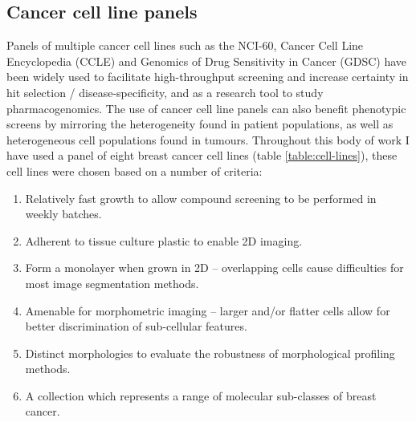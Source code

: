 \documentclass[a4paper,11pt,twoside,openright]{scrbook}
\begin{document}
\subsection{Cancer cell line panels}
Panels of multiple cancer cell lines such as the NCI-60, Cancer Cell Line Encyclopedia (CCLE) \cite{Barretina2012} and Genomics of Drug Sensitivity in Cancer (GDSC) \cite{Yang2013} have been widely used to facilitate high-throughput screening and increase certainty in hit selection / disease-specificity,\cite{Wu1992,Shoemaker2006} and as a research tool to study pharmacogenomics. \cite{Heiser2012,Abaan2013,Jaeger2015}
The use of cancer cell line panels can also benefit phenotypic screens by mirroring the heterogeneity found in patient populations, as well as heterogeneous cell populations found in tumours. \cite{Caie2010}
Throughout this body of work I have used a panel of eight breast cancer cell lines (table \ref{table:cell-lines}), these cell lines were chosen based on a number of criteria:
\begin{enumerate}
    \item Relatively fast growth to allow compound screening to be performed in weekly batches.
    \item Adherent to tissue culture plastic to enable 2D imaging.
    \item Form a monolayer when grown in 2D -- overlapping cells cause difficulties for most image segmentation methods.
    \item Amenable for morphometric imaging -- larger and/or flatter cells allow for better discrimination of sub-cellular features.
    \item Distinct morphologies to evaluate the robustness of morphological profiling methods.
    \item A collection which represents a range of molecular sub-classes of breast cancer.
\end{enumerate}
\end{document}
